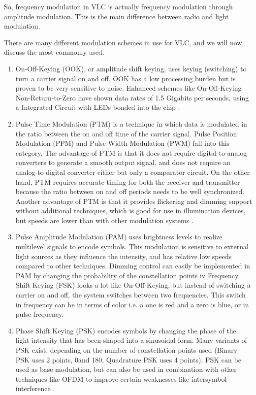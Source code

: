 So, frequency modulation in VLC is actually frequency modulation through amplitude
modulation. This is the main difference between radio and light modulation.

There are many different modulation schemes in use for VLC, and we will now
discuss the most commonly used.

\begin{enumerate}

\item On-Off-Keying (OOK), or amplitude shift keying, uses keying (switching) to
turn a carrier signal on and off. OOK has a low processing burden but is
proven to be very sensitive to noise. Enhanced schemes like On-Off-Keying
Non-Return-to-Zero have shown data rates of 1.5 Gigabits per seconds,
using a Integrated Circuit with LEDs bonded into the chip \citep{ook-450}.

\item Pulse Time Modulation (PTM) is a technique in which data is modulated
in the ratio between the on and off time of the carrier signal. Pulse Position
Modulation (PPM) and Pulse Width Modulation (PWM) fall into this
category. The advantage of PTM is that it does not require digital-to-analog
converters to generate a smooth output signal, and does not require an
analog-to-digital converter either but only a comparator circuit. On the other
hand, PTM requires accurate timing for both the receiver and transmitter
because the ratio between on and off periods needs to be well synchronized.
Another advantage of PTM is that it provides flickering and dimming
support without additional techniques, which is good for use in illumination
devices, but speeds are lower than with other modulation systems \citep{ppm}.


\item  Pulse Amplitude Modulation (PAM) uses brightness levels to realize multilevel
signals to encode symbols. This modulation is sensitive to external
light sources as they influence the intensity, and has relative low speeds
compared to other techniques. Dimming control can easily be implemented
in PAM by changing the probability of the constellation points \citep{diming}
iv Frequency Shift Keying (FSK) looks a lot like On-Off-Keying, but instead of
switching a carrier on and off, the system switches between two frequencies.
This switch in frequency can be in terms of color i.e. a one is red and
a zero is blue, or in pulse frequency.

\item Phase Shift Keying (PSK) encodes symbols by changing the phase of the
light intensity that has been shaped into a sinusoidal form. Many variants
of PSK exist, depending on the number of constellation points used (Binary
PSK uses 2 points, 0\degree  and 180\degree , Quadrature PSK uses 4 points). PSK
can be used as base modulation, but can also be used in combination
with other techniques like OFDM to improve certain weaknesses like intersymbol
interference \citep{ofdm-plc}.


\end{enumerate}
